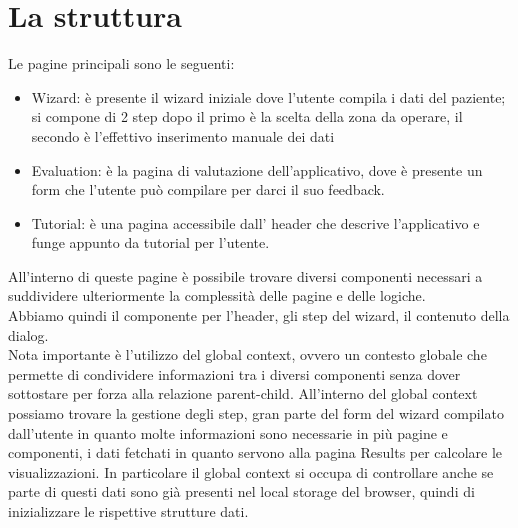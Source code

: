 \section{La struttura}
Le pagine principali sono le seguenti:\\ 
\begin{itemize}
\item Wizard: è presente il wizard iniziale dove l'utente compila i dati del paziente; si compone di 2 step dopo il primo è la scelta della zona da operare, il secondo è l'effettivo inserimento manuale dei dati
\item Evaluation: è la pagina di valutazione dell'applicativo, dove è presente un form che l'utente può compilare per darci il suo feedback. 
\item Tutorial: è una pagina accessibile dall' header che descrive l'applicativo e funge appunto da tutorial per l'utente. 
\end{itemize}
All'interno di queste pagine è possibile trovare diversi componenti necessari a suddividere ulteriormente la complessità delle pagine e delle logiche.\\ 
Abbiamo quindi il componente per l'header, gli step del wizard, il contenuto della dialog.\\

Nota importante è l'utilizzo del global context, ovvero un contesto globale che permette di condividere informazioni tra i diversi componenti senza dover sottostare per forza alla relazione parent-child. All'interno del global context possiamo trovare la gestione degli step, gran parte del form del wizard compilato dall'utente in quanto molte informazioni sono necessarie in più pagine e componenti, i dati fetchati in quanto servono alla pagina Results per calcolare le visualizzazioni. In particolare il global context si occupa di controllare anche se parte di questi dati sono già presenti nel local storage del browser, quindi di inizializzare le rispettive strutture dati. 

